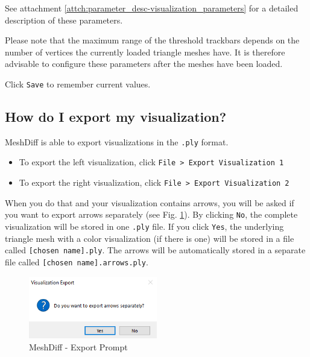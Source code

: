 See attachment \ref{attch:parameter_desc-visualization_parameters} for a detailed description of these parameters.

Please note that the maximum range of the threshold trackbars depends on the number of vertices the currently loaded triangle meshes have. It is therefore advisable to configure these parameters after the meshes have been loaded.

Click \verb+Save+ to remember current values.

\subsection{How do I export my visualization?}
\label{attch:user_doc-export_vis}

MeshDiff is able to export visualizations in the \verb+.ply+ format.

\begin{itemize}
\item To export the left visualization, click \verb+File > Export Visualization 1+
\item To export the right visualization, click \verb+File > Export Visualization 2+
\end{itemize}

When you do that and your visualization contains arrows, you will be asked if you want to export arrows separately (see Fig. \ref{fig:meshdiff-separate_arrows_prompt}). By clicking \verb+No+, the complete visualization will be stored in one \verb+.ply+ file. If you click \verb+Yes+, the underlying triangle mesh with a color visualization (if there is one) will be stored in a file called \verb+[chosen name].ply+. The arrows will be automatically stored in a separate file called \verb+[chosen name].arrows.ply+.

\begin{figure}[h]
\centering
\includegraphics[width=0.5\textwidth]{./img/meshdiff-separate_arrows.PNG}
\caption[MeshDiff - Export Prompt]{MeshDiff - Export Prompt}
\label{fig:meshdiff-separate_arrows_prompt}
\end{figure}

